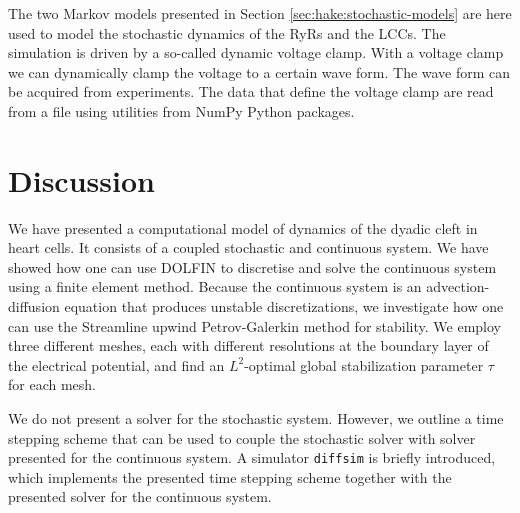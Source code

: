 The two Markov models presented in Section
\ref{sec:hake:stochastic-models} are here used to model the stochastic
dynamics of the RyRs and the LCCs. The simulation is driven by a
so-called dynamic voltage clamp. With a voltage clamp we can
dynamically clamp the voltage to a certain wave form. The wave form
can be acquired from experiments. The data that define the voltage
clamp are read from a file using utilities from NumPy Python packages.

\section{Discussion}

We have presented a computational model of \Ca dynamics of the dyadic
cleft in heart cells. It consists of a coupled stochastic and
continuous system. We have showed how one can use DOLFIN to discretise
and solve the continuous system using a finite element method. Because
the continuous system is an advection-diffusion equation that produces
unstable discretizations, we investigate how one can use the
Streamline upwind Petrov-Galerkin method for stability. We employ
three different meshes, each with different resolutions at the
boundary layer of the electrical potential, and find an $L^2$-optimal
global stabilization parameter $\tau$ for each mesh.

We do not present a solver for the stochastic system. However, we
outline a time stepping scheme that can be used to couple the
stochastic solver with solver presented for the continuous system. A
simulator \texttt{diffsim} is briefly introduced, which implements the
presented time stepping scheme together with the presented solver for
the continuous system.

